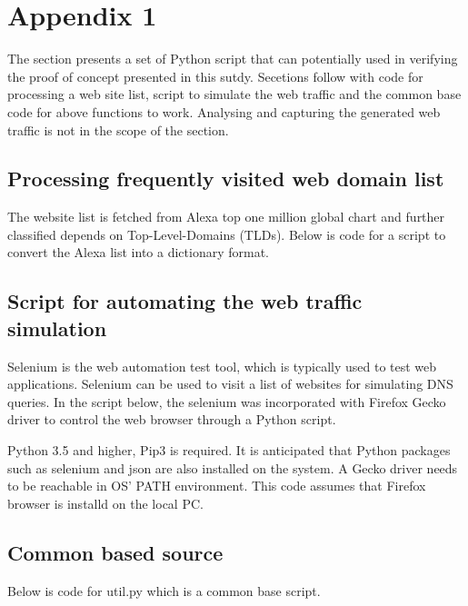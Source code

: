 \documentclass[a4paper,12pt]{article}
\begin{document}
%
\newpage

\hypersetup{urlcolor=black}


\newpage
\setcounter{page}{1} %
\appendix

\section{Appendix 1}
The section presents a set of Python script that can potentially used in verifying the proof of concept presented in this sutdy.
Secetions follow with code for processing a web site list, script to simulate the web traffic and the common base code for above functions to work.
Analysing and capturing the generated web traffic is not in the scope of the section.

\subsection{Processing frequently visited web domain list} \label{processweblist}
The website list is fetched from Alexa top one million global chart and further classified depends on Top-Level-Domains (TLDs).
Below is code for a script to convert the Alexa list into a dictionary format.

\subsection{Script for automating the web traffic simulation}
Selenium is the web automation test tool\cite{holmes2006automating}, which is typically used to test web applications. Selenium can be used to visit a list of websites for simulating DNS queries. In the script below, the selenium was incorporated with Firefox Gecko driver to control the web browser through a Python script.

Python 3.5 and higher, Pip3 is required. It is anticipated that Python packages such as selenium and json are also installed on the system. A Gecko driver needs to be reachable in OS' PATH environment. This code assumes that Firefox browser is installd on the local PC.

\subsection{Common based source}
Below is code for util.py which is a common base script.
\end{document}
